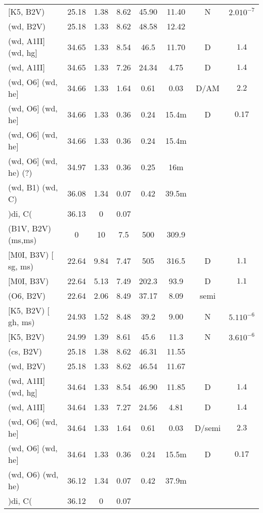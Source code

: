 \documentclass{article}
\begin{document}
\begin{table}
\begin{tabular}{p{4cm}ccccccc}
$[$K5, B2V)	 	& 25.18	& 1.38	& 8.62	& 45.90	& 11.40	& N	& $2.0 10^{-7}$		\\
(wd, B2V)	 	& 25.18	& 1.33	& 8.62	& 48.58	& 12.42	&	&			\\
(wd, A1II$]$ (wd, hg$]$	& 34.65	& 1.33	& 8.54	& 46.5 	& 11.70	& D	& $1.4$			\\
(wd, A1II$]$	 	& 34.65	& 1.33	& 7.26	& 24.34	& 4.75	& D	& $1.4$			\\
(wd, O6$]$ (wd, he$]$	& 34.66	& 1.33	& 1.64	& 0.61	& 0.03	& D/AM  & $2.2$			\\
(wd, O6$]$ (wd, he$]$	& 34.66	& 1.33	& 0.36	& 0.24	& 15.4m	& D	& $0.17$ 		\\
(wd, O6$]$ (wd, he$]$	& 34.66	& 1.33	& 0.36	& 0.24	& 15.4m	&  	&        		\\
(wd, O6] (wd, he) (?)	& 34.97	& 1.33 	& 0.36	& 0.25 	& 16m	&	&    			\\
(wd, B1) (wd, C) 	& 36.08	& 1.34	& 0.07	& 0.42	& 39.5m	&	&    			\\
)di, C( 	 	& 36.13	& 0	& 0.07	&	&	&	&    			\\ 
\hline
(B1V, B2V) (ms,ms)	& 0	& 10	& 7.5	& 500	& 309.9	&	&			\\
$[$M0I, B3V) $[$sg, ms)	& 22.64	& 9.84	& 7.47	& 505	& 316.5	& D	& $1.1$			\\
$[$M0I, B3V)	 	& 22.64	& 5.13	& 7.49	& 202.3	& 93.9	& D	& $1.1$			\\
(O6, B2V)	 	& 22.64	& 2.06	& 8.49	& 37.17	& 8.09	& semi	&			\\
$[$K5, B2V) $[$gh, ms)	& 24.93	& 1.52	& 8.48	& 39.2 	& 9.00	& N	& $5.1 10^{-6}$		\\
$[$K5, B2V)	 	& 24.99	& 1.39	& 8.61	& 45.6	& 11.3	& N	& $3.6 10^{-6}$		\\
(cs, B2V)	 	& 25.18	& 1.38	& 8.62	& 46.31	& 11.55	&	&			\\
(wd, B2V)	 	& 25.18	& 1.33	& 8.62	& 46.54	& 11.67	&	&			\\
(wd, A1II$]$ (wd, hg$]$	& 34.64	& 1.33	& 8.54	& 46.90	& 11.85	& D	& $1.4$			\\
(wd, A1II$]$	 	& 34.64	& 1.33	& 7.27	& 24.56	& 4.81	& D	& $1.4$			\\
(wd, O6$]$ (wd, he$]$	& 34.64	& 1.33	& 1.64	& 0.61	& 0.03	& D/semi& $2.3$			\\
(wd, O6$]$ (wd, he$]$	& 34.64	& 1.33	& 0.36	& 0.24	& 15.5m	& D	& $0.17$ 		\\
(wd, O6) (wd, he)   	& 36.12	& 1.34 	& 0.07	& 0.42 	& 37.9m	&       &                       \\
)di, C( 	 	& 36.12	& 0	& 0.07	&	&	&	&    			\\ 

\end{tabular}
\end{table}
\end{document}
